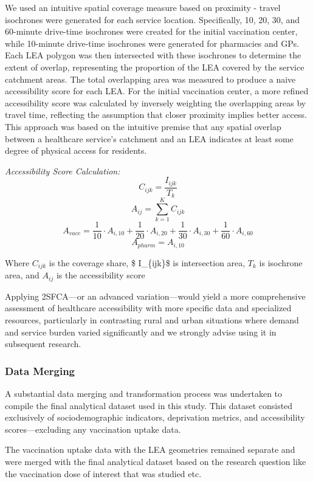 \documentclass{article}
\begin{document}
We used an intuitive spatial coverage measure based on proximity -
travel isochrones were generated for each service location.
Specifically, 10, 20, 30, and 60-minute drive-time isochrones were
created for the initial vaccination center, while 10-minute drive-time
isochrones were generated for pharmacies and GPs. Each LEA polygon was
then intersected with these isochrones to determine the extent of
overlap, representing the proportion of the LEA covered by the service
catchment areas. The total overlapping area was measured to produce a
naive accessibility score for each LEA. For the initial vaccination
center, a more refined accessibility score was calculated by inversely
weighting the overlapping areas by travel time, reflecting the
assumption that closer proximity implies better access. This approach
was based on the intuitive premise that any spatial overlap between a
healthcare service's catchment and an LEA indicates at least some degree
of physical access for residents.

\emph{Accessibility Score Calculation:}
\[C_{ijk} = \frac{I_{ijk}}{T_k}\] \[A_{ij} = \sum_{k=1}^{K} C_{ijk}\]
\[A_{vacc} = \frac{1}{10} \cdot A_{i,10} + \frac{1}{20} \cdot A_{i,20} + \frac{1}{30} \cdot A_{i,30} + \frac{1}{60} \cdot A_{i,60}\]
\[A_{pharm} = A_{i,10}\]

Where \(C_{ijk}\) is the coverage share, \$ I\_\{ijk\}\$ is intersection
area, \(T_k\) is isochrone area, and \(A_{ij}\) is the accessibility
score

Applying 2SFCA---or an advanced variation---would yield a more
comprehensive assessment of healthcare accessibility with more specific
data and specialized resources, particularly in contrasting rural and
urban situations where demand and service burden varied significantly
and we strongly advise using it in subsequent research.

\subsubsection{Data Merging}\label{data-merging}

A substantial data merging and transformation process was undertaken to
compile the final analytical dataset used in this study. This dataset
consisted exclusively of sociodemographic indicators, deprivation
metrics, and accessibility scores---excluding any vaccination uptake
data.

The vaccination uptake data with the LEA geometries remained separate
and were merged with the final analytical dataset based on the research
question like the vaccination dose of interest that was studied etc.
\end{document}
